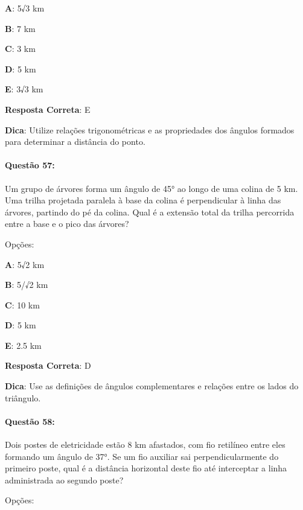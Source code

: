 \documentclass{article}
\begin{document}
\vspace{\baselineskip}\textbf{A}: 5√3 km 

\textbf{B}: 7 km 

\textbf{C}: 3 km 

\textbf{D}: 5 km 

\textbf{E}: 3√3 km 

\vspace{\baselineskip}\textbf{Resposta Correta}: E

\vspace{\baselineskip}\textbf{Dica}: Utilize relações trigonométricas e as propriedades dos ângulos formados para determinar a distância do ponto.

\paragraph{Questão 57:}
{Um grupo de árvores forma um ângulo de 45° ao longo de uma colina de 5 km. Uma trilha projetada paralela à base da colina é perpendicular à linha das árvores, partindo do pé da colina. Qual é a extensão total da trilha percorrida entre a base e o pico das árvores?}

\vspace{\baselineskip}Opções:

\vspace{\baselineskip}\textbf{A}: 5√2 km 

\textbf{B}: 5/√2 km 

\textbf{C}: 10 km 

\textbf{D}: 5 km 

\textbf{E}: 2.5 km 

\vspace{\baselineskip}\textbf{Resposta Correta}: D

\vspace{\baselineskip}\textbf{Dica}: Use as definições de ângulos complementares e relações entre os lados do triângulo.

\paragraph{Questão 58:}
{Dois postes de eletricidade estão 8 km afastados, com fio retilíneo entre eles formando um ângulo de 37°. Se um fio auxiliar sai perpendicularmente do primeiro poste, qual é a distância horizontal deste fio até interceptar a linha administrada ao segundo poste?}

\vspace{\baselineskip}Opções:
\end{document}
